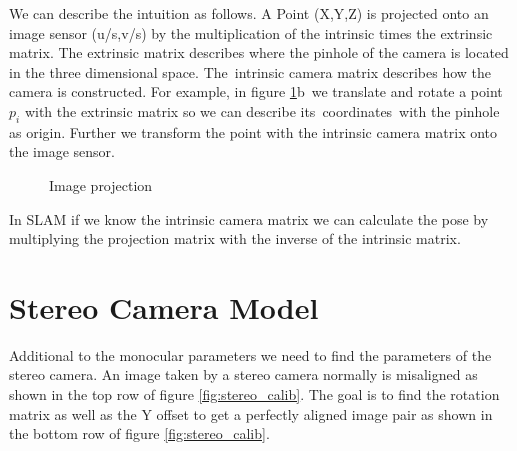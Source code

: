 \documentclass[11pt,a4paper,titlepage,oneside]{report}
\begin{document}
We can describe the intuition as follows. A Point (X,Y,Z) is projected onto an image sensor (u/s,v/s) by the multiplication of the intrinsic times the extrinsic matrix. The extrinsic matrix describes where the pinhole of the camera is located in the three dimensional space. The intrinsic camera matrix describes how the camera is constructed. For example, in figure \ref{fig:projection}b we translate and rotate a point $p_i$ with the extrinsic matrix so we can describe its coordinates with the pinhole as origin. Further we transform the point with the intrinsic camera matrix onto the image sensor.

\begin{figure}[H]
	\centering
	\caption{Image projection}\label{fig:projection}
\end{figure}

In SLAM if we know the intrinsic camera matrix we can calculate the pose by multiplying the projection matrix with the inverse of the intrinsic matrix.

\section{Stereo Camera Model}

Additional to the monocular parameters we need to find the parameters of the stereo camera. An image taken by a stereo camera normally is misaligned as shown in the top row of figure \ref{fig:stereo_calib}. The goal is to find the rotation matrix as well as the Y offset to get a perfectly aligned image pair as shown in the bottom row of figure \ref{fig:stereo_calib}.
\end{document}
